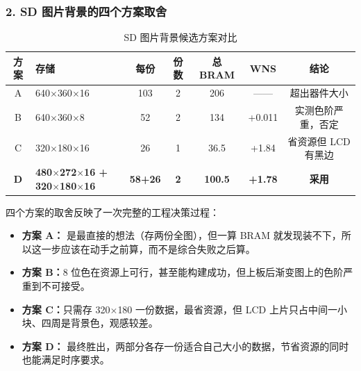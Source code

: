 \documentclass[withoutpreface,bwprint]{cumcmthesis}
\begin{document}
%
%
%

\subsubsection*{2. SD 图片背景的四个方案取舍}

\begin{table}[H]
\centering
\caption{SD 图片背景候选方案对比}
\label{tab:fb}
\begin{tabular}{cp{4.0cm}ccccc}
\toprule[1.5pt]
\rowcolor{gray!25} 方案 & 存储 & 每份 & 份数 & 总 BRAM & WNS & 结论 \\
\midrule[1pt]
A & 640$\times$360$\times$16 & 103 & 2 & 206 & —— & 超出器件大小 \\
B & 640$\times$360$\times$8  & 52  & 2 & 134 & +0.011 & 实测色阶严重，否定 \\
C & 320$\times$180$\times$16 & 26  & 1 & 36.5 & +1.84 & 省资源但 LCD 有黑边 \\
\textbf{D} & \textbf{480$\times$272$\times$16 + 320$\times$180$\times$16} & \textbf{58+26} & \textbf{2} & \textbf{100.5} & \textbf{+1.78} & \textbf{采用} \\
\bottomrule[1.5pt]
\end{tabular}
\end{table}

四个方案的取舍反映了一次完整的工程决策过程：

\begin{itemize}
\item \textbf{方案 A：} 是最直接的想法（存两份全图），但一算 BRAM 就发现装不下，所以这一步应该在动手之前算，而不是综合失败之后算。
\item \textbf{方案 B：}8 位色在资源上可行，甚至能构建成功，但上板后渐变图上的色阶严重到不可接受。
\item \textbf{方案 C：}只需存 320$\times$180 一份数据，最省资源，但 LCD 上片只占中间一小块、四周是背景色，观感较差。
\item \textbf{方案 D：} 最终胜出，两部分各存一份适合自己大小的数据，节省资源的同时也能满足时序要求。
\end{itemize}
\end{document}
